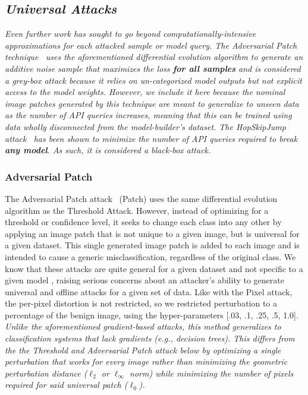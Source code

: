 \documentclass[journal]{IEEEtran}
\newcommand{\cm}[1]{\textit{{\color{blue}#1}}}
\begin{document}
\subsection{\cm{Universal Attacks}}
\label{universal}
\cm{
Even further work has sought to go beyond computationally-intensive approximations for each attacked sample or model query. The \textit{Adversarial Patch technique}~\cite{adversarialpatch} uses the aforementioned differential evolution algorithm to generate an additive noise sample that maximizes the loss \textbf{for all samples} and is considered a \textit{grey-box} attack because it relies on un-categorized model outputs but not explicit access to the model weights. However, we include it here because the nominal image patches generated by this technique are meant to generalize to unseen data as the number of API queries increases, meaning that this can be trained using data wholly disconnected from the model-builder's dataset. The \textit{HopSkipJump} attack~\cite{hopskipjump} has been shown to minimize the number of API queries required to break \textbf{any model}. As such, it is considered a \textit{black-box} attack. 
}


\subsubsection{Adversarial Patch}

The Adversarial Patch attack~\cite{adversarialpatch} (Patch) uses the same differential evolution algorithm as the Threshold Attack. However, instead of optimizing for a threshold or confidence level, it seeks to change each class into any other by applying an image patch that is not unique to a given image, but is universal for a  given dataset. This single generated image patch is added to each image and is intended to cause a generic misclassification, regardless of the original class.  We know that these attacks are quite general for a given dataset and not specific to a given model \cite{adversarialpatch, xiao2021improving}, raising serious concerns about an attacker's ability to generate universal and offline attacks for a given set of data. Like with the Pixel attack, the per-pixel distortion is not restricted, so we restricted perturbation to a percentage of the benign image, using the hyper-parameters [.03, .1, .25, .5, 1.0].  \cm{Unlike the aforementioned gradient-based attacks, this method generalizes to classification systems that lack gradients (\textit{e.g.}, decision trees). This differs from the the \textit{Threshold} and \textit{Adversarial Patch} attack below by optimizing a single perturbation that works for every image rather than minimizing the geometric perturbation distance ($\ell_2$ or $\ell_{\infty}$ norm) while minimizing the number of pixels required for said universal patch ($\ell_0$).}
\end{document}
